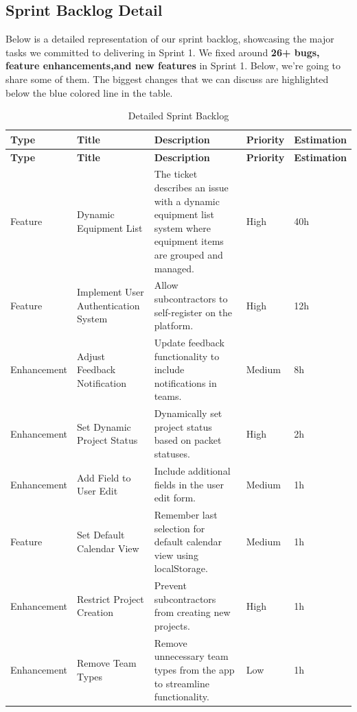 \subsection{Sprint Backlog Detail}
Below is a detailed representation of our sprint backlog, showcasing the major tasks we committed to delivering in Sprint 1. We fixed around \textbf{26+ bugs, feature enhancements,and new features }in Sprint 1. Below, we're going to share some of them. The biggest changes that we can discuss are highlighted below the blue colored line in the table.
\begin{longtable}{ | m{} | m{} | m{} | m{} | m{} | }
    \caption{Detailed Sprint Backlog} \\
    \hline
    \textbf{Type} & \textbf{Title} & \textbf{Description} & \textbf{Priority} & \textbf{Estimation} \\
    \hline
    \endfirsthead
    \hline
    \textbf{Type} & \textbf{Title} & \textbf{Description} & \textbf{Priority} & \textbf{Estimation} \\
    \hline
    \endhead
    \hline
    \endfoot
    \endlastfoot
    \rowcolor{blue!20} 
    Feature & Dynamic Equipment List & The ticket describes an issue with a dynamic equipment list system where equipment items are grouped and managed. & High & 40h \\
    \hline
    Feature & Implement User Authentication System & Allow subcontractors to self-register on the platform. & High & 12h \\
    \hline
    \rowcolor{blue!20} 
    Enhancement & Adjust Feedback Notification & Update feedback functionality to include notifications in teams. & Medium & 8h \\
    \hline
    Enhancement & Set Dynamic Project Status & Dynamically set project status based on packet statuses. & High & 2h \\
    \hline
    Enhancement & Add Field to User Edit & Include additional fields in the user edit form. & Medium & 1h \\
    \hline
    Feature & Set Default Calendar View & Remember last selection for default calendar view using localStorage. & Medium & 1h \\
    \hline
    Enhancement & Restrict Project Creation & Prevent subcontractors from creating new projects. & High & 1h \\
    \hline
    Enhancement & Remove Team Types & Remove unnecessary team types from the app to streamline functionality. & Low & 1h \\

\end{longtable}
